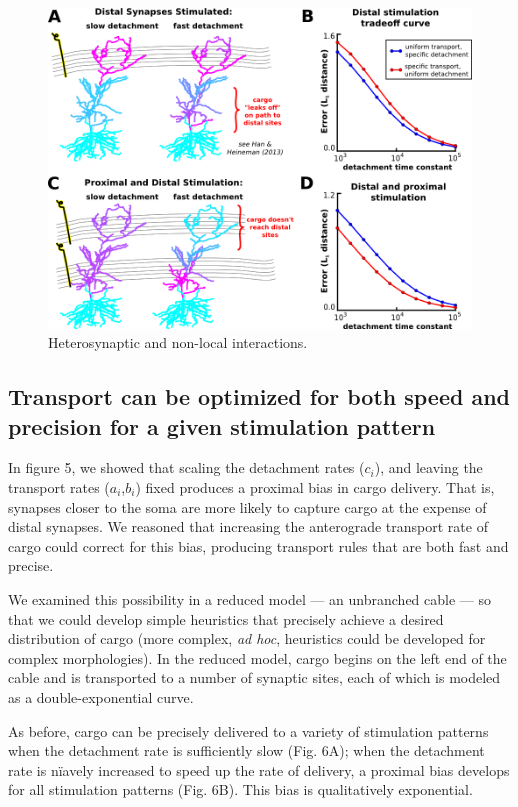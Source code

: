 \documentclass[10pt]{wlpeerj}
\begin{document}
\begin{figure}[!htbp]
\begin{center}
\includegraphics[width=0.9\columnwidth]{05_heterosynaptic_ca1.png}
\caption{Heterosynaptic and non-local interactions.
}
\end{center}
\end{figure}

\subsection*{Transport can be optimized for both speed and precision for a given stimulation pattern}

In figure 5, we showed that scaling the detachment rates ($c_i$), and leaving the transport rates ($a_i$,$b_i$) fixed produces a proximal bias in cargo delivery. That is, synapses closer to the soma are more likely to capture cargo at the expense of distal synapses. We reasoned that increasing the anterograde transport rate of cargo could correct for this bias, producing transport rules that are both fast and precise.

We examined this possibility in a reduced model --- an unbranched cable --- so that we could develop simple heuristics that precisely achieve a desired distribution of cargo (more complex, \textit{ad hoc}, heuristics could be developed for complex morphologies). In the reduced model, cargo begins on the left end of the cable and is transported to a number of synaptic sites, each of which is modeled as a double-exponential curve.

As before, cargo can be precisely delivered to a variety of stimulation patterns when the detachment rate is sufficiently slow (Fig. 6A); when the detachment rate is n\"iavely increased to speed up the rate of delivery, a proximal bias develops for all stimulation patterns (Fig. 6B). This bias is qualitatively exponential.
\end{document}
